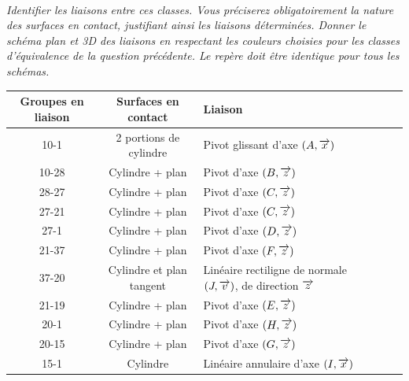 \documentclass[11pt,oneside]{article}
\begin{document}
\paragraph{}
\textit{Identifier les liaisons entre ces classes. Vous préciserez obligatoirement la nature des surfaces en contact, justifiant ainsi les liaisons déterminées. Donner le schéma plan et 3D des liaisons en respectant les couleurs choisies pour les classes d'équivalence de la question précédente. Le repère doit être identique pour tous les schémas.}
		
\begin{center}
\begin{tabular}{|c|c|p{}|c|c|}
\hline
Groupes en liaison & Surfaces en contact & Liaison \\
\hline
\hline
10-1	&2 portions de cylindre& Pivot glissant d’axe $(A,\overrightarrow{x} )$ \\
\hline
10-28 &Cylindre + plan& Pivot d’axe $(B, \overrightarrow{z})$\\
\hline
28-27 &Cylindre + plan & Pivot d’axe $(C, \overrightarrow{z})$\\
\hline
27-21 & Cylindre + plan& Pivot d’axe $(C, \overrightarrow{z})$\\
\hline
27-1 &Cylindre + plan& Pivot d’axe $(D, \overrightarrow{z})$\\
\hline
21-37 &Cylindre + plan& Pivot d’axe $(F, \overrightarrow{z})$\\
\hline
37-20 &Cylindre et plan tangent& Linéaire rectiligne de normale $(J, \overrightarrow{v})$, de direction $\overrightarrow{z}$ \\
\hline
21-19 &Cylindre + plan& Pivot d’axe $(E, \overrightarrow{z})$\\
\hline
20-1 &Cylindre + plan& Pivot d’axe $(H,\overrightarrow{z} )$\\
\hline
20-15 &Cylindre + plan& Pivot d’axe $(G, \overrightarrow{z})$ \\
\hline
15-1&Cylindre&Linéaire annulaire d’axe $(I,  \overrightarrow{x})$\\
\hline
\end{tabular}
\end{center}


	
\end{document}
